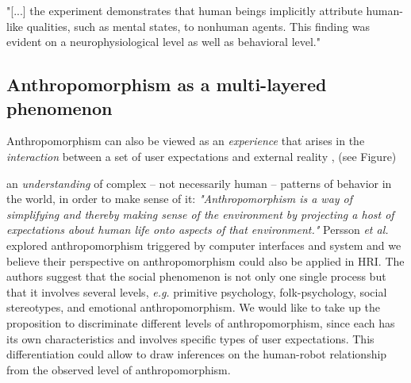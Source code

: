 \documentclass[lettersize, apacite, twoside, HRI]{apa_HRI}
\begin{document}
	
	

	


	

	"[...] the experiment demonstrates that human beings implicitly attribute human-like qualities, such as mental states, to nonhuman agents. This finding was evident on a neurophysiological level as well as behavioral level." \cite{hegel_understanding_2008}
	


\subsection{Anthropomorphism as a multi-layered phenomenon}
\label{sec:3.4}

Anthropomorphism can also be viewed as an \textit{experience} that arises in the \textit{interaction} between a set of user expectations and external reality \cite{persson_anthropomorphism_2000}, (see Figure)

an \textit{understanding} of complex -- not necessarily human -- patterns of behavior in the world, in order to make sense of it: \textit{"Anthropomorphism is a way of simplifying and thereby making sense of the environment by projecting a host of expectations about human life onto aspects of that environment."} \cite{persson_anthropomorphism_2000}
Persson \textit{et al.} explored anthropomorphism triggered by computer interfaces and system and we believe their perspective on anthropomorphism could also be applied in HRI. The authors suggest that the social phenomenon is not only one single process but that it involves several levels, \textit{e.g.} primitive psychology, folk-psychology, social stereotypes, and emotional anthropomorphism. We would like to take up the proposition to discriminate different levels of anthropomorphism, since each has its own characteristics and involves specific types of user expectations. This differentiation could allow to draw inferences on the human-robot relationship from the observed level of anthropomorphism.
\end{document}

